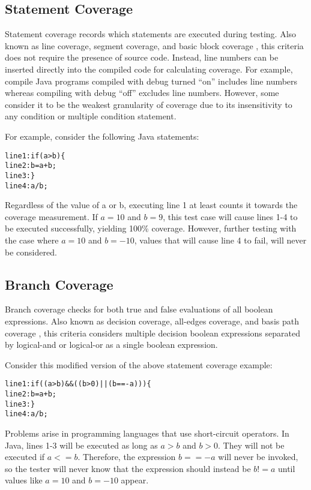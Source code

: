 \subsection{Statement Coverage} \label{section.statement.coverage}
Statement coverage records which statements are executed during testing.
Also known as line coverage, segment coverage, and basic block coverage
\cite{Cornett}, this criteria does not require the presence of source code.
Instead, line numbers can be inserted directly into the compiled code for
calculating coverage.  For example, compile Java programs compiled with
debug turned ``on'' includes line numbers whereas compiling with debug
``off'' excludes line numbers.  However, some consider it to be the weakest
granularity of coverage \cite{Kaner:1999} \cite{Myers:1979} due to its
insensitivity to any condition or multiple condition statement.

For example, consider the following Java statements:
\begin{alltt}
{\small{}line 1:  if (a > b) \{
line 2:    b = a + b;
line 3:  \}
line 4:  a / b;
}
\end{alltt}
Regardless of the value of a or b, executing line 1 at least counts it
towards the coverage measurement.  If $a=10$ and $b=9$, this test case will
cause lines 1-4 to be executed successfully, yielding 100\% coverage.
However, further testing with the case where $a=10$ and $b=-10$, values
that will cause line 4 to fail, will never be considered.

\subsection{Branch Coverage}
Branch coverage checks for both true and false evaluations of all boolean
expressions.  Also known as decision coverage, all-edges coverage, and
basis path coverage \cite{Cornett}, this criteria considers multiple
decision boolean expressions separated by logical-and or logical-or as a
single boolean expression.

Consider this modified version of the above statement coverage example:
\begin{alltt}
{\small{}line 1:  if ((a > b) && ((b > 0) || (b == -a))) \{
line 2:    b = a + b;
line 3:  \}
line 4:  a / b;
}
\end{alltt}
Problems arise in programming languages that use short-circuit operators.
In Java, lines 1-3 will be executed as long as $a>b$ and $b>0$.  They will
not be executed if $a<=b$.  Therefore, the expression $b==-a$ will never be
invoked, so the tester will never know that the expression should instead
be $b!=a$ until values like $a=10$ and $b=-10$ appear.

